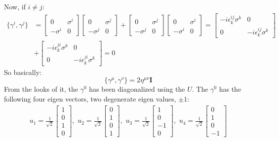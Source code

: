 \documentclass{article}
\begin{document}
Now, if $i\ne j$:
\begin{equation}
    \begin{split}
      \{\gamma^i,\gamma^j \}&=\begin{bmatrix}
          0 & \sigma^i \\ -\sigma^i & 0
      \end{bmatrix}  \begin{bmatrix}
          0 & \sigma^j \\ -\sigma^j & 0
      \end{bmatrix}  + \begin{bmatrix}
          0 & \sigma^j \\ -\sigma^j & 0
      \end{bmatrix} \begin{bmatrix}
          0 & \sigma^i \\ -\sigma^i & 0
      \end{bmatrix}  =  \begin{bmatrix}
          -i\epsilon^{ij}_k \sigma^k& 0 \\ 0 & -i\epsilon^{ij}_k\sigma^k
      \end{bmatrix} \\ &+ \begin{bmatrix}
         -i\epsilon^{ji}_k \sigma^k & 0 \\ 0 & -i\epsilon^{ji}_k\sigma^k
      \end{bmatrix}=0
    \end{split}
\end{equation}
So basically:
$$
\{\gamma^\mu,\gamma^\nu \}=2\eta^{\mu\nu}\mathbf{I}
$$
From the looks of it, the $\gamma^0$ has been diagonalized using the $U$. The $\gamma^0$ has the following four eigen vectors, two degenerate eigen values, $\pm1$:
\begin{equation}
    \begin{split}
        u_1=\frac{1}{\sqrt{2}}\begin{bmatrix}
            1 \\ 0 \\ 1 \\ 0
        \end{bmatrix},\,\,u_2=\frac{1}{\sqrt{2}}\begin{bmatrix}
            0 \\ 1 \\ 0 \\ 1
        \end{bmatrix},\,\, u_3=\frac{1}{\sqrt{2}}\begin{bmatrix}
            1 \\ 0 \\ -1 \\ 0
        \end{bmatrix},\,\,u_4=\frac{1}{\sqrt{2}}\begin{bmatrix}
            0 \\ 1 \\ 0 \\ -1
        \end{bmatrix}
    \end{split}
\end{equation}
\end{document}
